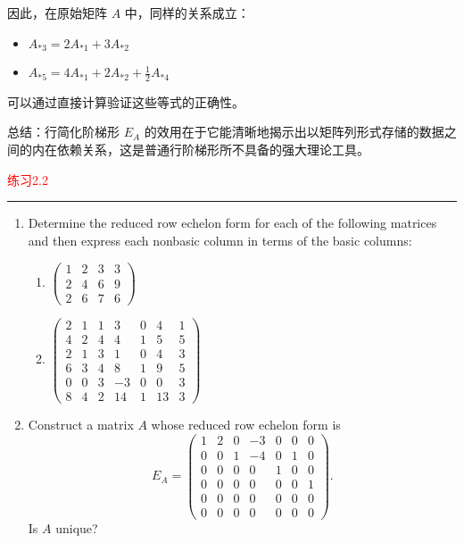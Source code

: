 \documentclass[10pt, a4paper]{article}
\begin{document}
因此，在原始矩阵 \( A \) 中，同样的关系成立：
\begin{itemize}
    \item \( A_{*3} = 2A_{*1} + 3A_{*2} \)
    \item \( A_{*5} = 4A_{*1} + 2A_{*2} + \frac{1}{2}A_{*4} \)
\end{itemize}

可以通过直接计算验证这些等式的正确性。

总结：行简化阶梯形 \( E_A \) 的效用在于它能清晰地揭示出以矩阵列形式存储的数据之间的内在依赖关系，这是普通行阶梯形所不具备的强大理论工具。

\textcolor{red}{练习2.2}
\color{red}\rule{\textwidth}{0.4pt}\color{black}

\begin{enumerate}[leftmargin=*, label=\bfseries 2.2.\arabic*]

\item Determine the reduced row echelon form for each of the following matrices and then express each nonbasic column in terms of the basic columns:
\begin{enumerate}[label=(\alph*)]
    \item \(\begin{pmatrix}
        1 & 2 & 3 & 3 \\
        2 & 4 & 6 & 9 \\
        2 & 6 & 7 & 6 
    \end{pmatrix}\)
    
    \item \(\begin{pmatrix}
        2 & 1 & 1 & 3 & 0 & 4 & 1 \\
        4 & 2 & 4 & 4 & 1 & 5 & 5 \\
        2 & 1 & 3 & 1 & 0 & 4 & 3 \\
        6 & 3 & 4 & 8 & 1 & 9 & 5 \\
        0 & 0 & 3 & -3 & 0 & 0 & 3 \\
        8 & 4 & 2 & 14 & 1 & 13 & 3 
    \end{pmatrix}\)
\end{enumerate}

\item Construct a matrix \( A \) whose reduced row echelon form is
\[
E_A = \begin{pmatrix}
1 & 2 & 0 & -3 & 0 & 0 & 0 \\
0 & 0 & 1 & -4 & 0 & 1 & 0 \\
0 & 0 & 0 & 0 & 1 & 0 & 0 \\
0 & 0 & 0 & 0 & 0 & 0 & 1 \\
0 & 0 & 0 & 0 & 0 & 0 & 0 \\
0 & 0 & 0 & 0 & 0 & 0 & 0 
\end{pmatrix}.
\]
Is \( A \) unique?


\end{enumerate}
\end{document}

